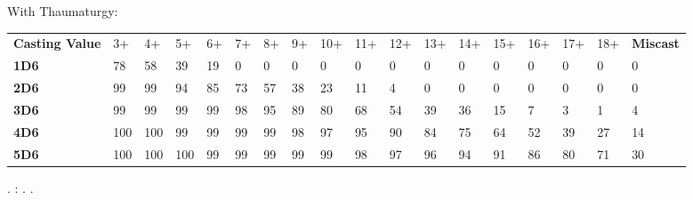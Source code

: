 \documentclass[a4paper,10pt]{article}
\begin{document}
With Thaumaturgy:
{
\begin{center}
\setlength{\tabcolsep}{3pt}
\alternaterowcolors\begin{tabular}{M{3cm}*{16}{M{0.58cm}}M{1.5cm}}
\hline
\textbf{Casting Value} & 3+ & 4+ & 5+ & 6+ & 7+ & 8+ & 9+ & 10+ & 11+ & 12+ & 13+ & 14+ & 15+ & 16+ & 17+ & 18+ & \textbf{Miscast} \\
\textbf{1D6} & \num{78} & \num{58} & \num{39} & \num{19} & \num{0} & \num{0} & \num{0} & \num{0} & \num{0} & \num{0} & \num{0} & \num{0} & \num{0} & \num{0} & \num{0} & \num{0} & \num{0} \\
\textbf{2D6} & \num{99} & \num{99} & \num{94} & \num{85} & \num{73} & \num{57} & \num{38} & \num{23} & \num{11} & \num{4} & \num{0} & \num{0} & \num{0} & \num{0} & \num{0} & \num{0} & \num{0} \\
\textbf{3D6} & \num{99} & \num{99} & \num{99} & \num{99} & \num{98} & \num{95} & \num{89} & \num{80} & \num{68} & \num{54} & \num{39} & \num{36} & \num{15} & \num{7} & \num{3} & \num{1} & \num{4} \\
\textbf{4D6} & \num{100} & \num{100} & \num{99} & \num{99} & \num{99} & \num{99} & \num{98} & \num{97} & \num{95} & \num{90} & \num{84} & \num{75} & \num{64} & \num{52} & \num{39} & \num{27} & \num{14} \\
\textbf{5D6} & \num{100} & \num{100} & \num{100} & \num{99} & \num{99} & \num{99} & \num{99} & \num{99} & \num{98} & \num{97} & \num{96} & \num{94} & \num{91} & \num{86} & \num{80} & \num{71} & \num{30} \\
\hline
\end{tabular}
\end{center}
}

\newpage


\summarysubsection{\paths{}}

\textbf{\typescapital{}} \alphaorderlistX{ -- }{\augmentShort{}: \augment{},\damageShort{}: \damage{},\directShort{}: \direct{},\focusedShort{}: \focused{},\groundShort{}: \ground{},\hexShort{}: \hex{},\missileShort{}: \missile{},\universalShort{}: \universal{}}.\newline
\textbf{\rangecapital{}} \auraShort{}: \aura{}. \textbf{\durationcapital{}} \alphaorderlistX{ -- }{\instantShort{}: \instant{},\oneturnShort{}: \oneturn{},\permanentShort{}: \permanent{}}.
\end{document}
